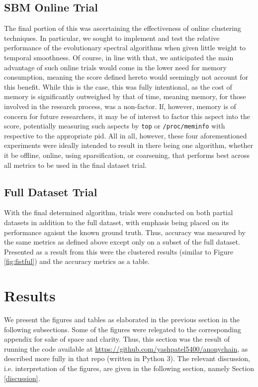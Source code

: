 \documentclass{article}
\begin{document}
\subsection{SBM Online Trial}
The final portion of this was ascertaining the effectiveness of online clustering techniques. In particular, we sought to implement and test the relative performance of the evolutionary spectral algorithms when given little weight to temporal smoothness. Of course, in line with that, we anticipated the main advantage of such online trials would come in the lower need for memory consumption, meaning the score defined hereto would seemingly not account for this benefit. While this is the case, this was fully intentional, as the cost of memory is significantly outweighed by that of time, meaning memory, for those involved in the research process, was a non-factor. If, however, memory is of concern for future researchers, it may be of interest to factor this aspect into the score, potentially measuring such aspects by \texttt{top} or \texttt{/proc/meminfo} with respective to the appropriate pid. All in all, however, these four aforementioned experiments were ideally intended to result in there being one algorithm, whether it be offline, online, using sparsification, or coarsening, that performs best across all metrics to be used in the final dataset trial. 

\subsection{Full Dataset Trial}
With the final determined algorithm, trials were conducted on both partial datasets in addition to the full dataset, with emphasis being placed on its performance agaisnt the known ground truth. Thus, accuracy was measured by the same metrics as defined above except only on a subset of the full dataset. Presented as a result from this were the clustered results (similar to Figure \ref{fig:fistful}) and the accuracy metrics as a table.

\section{Results}\label{results}
We present the figures and tables as elaborated in the previous section in the following subsections. Some of the figures were relegated to the corresponding appendix for sake of space and clarity. Thus, this section was the result of running the code available at \url{https://github.com/yashpatel5400/anonychain}, as described more fully in that repo (written in Python 3). The relevant discussion, i.e. interpretation of the figures, are given in the following section, namely Section \ref{discussion}.
\end{document}
